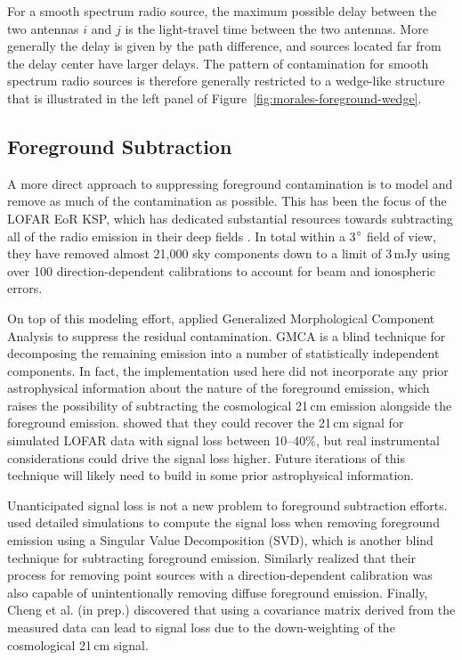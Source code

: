 \begin{bibunit}
For a smooth spectrum radio source, the maximum possible delay between the two antennas $i$ and $j$
is the light-travel time between the two antennas. More generally the delay is given by the path
difference, and sources located far from the delay center have larger delays. The pattern of
contamination for smooth spectrum radio sources is therefore generally restricted to a wedge-like
structure that is illustrated in the left panel of Figure~\ref{fig:morales-foreground-wedge}.


\subsection{Foreground Subtraction}

A more direct approach to suppressing foreground contamination is to model and remove as much of the
contamination as possible. This has been the focus of the LOFAR EoR KSP, which has dedicated
substantial resources towards subtracting all of the radio emission in their deep fields
\citep{2017ApJ...838...65P}. In total within a 3$\mbox{$^\circ$}$ field of view, they have removed almost
21,000 sky components down to a limit of 3\,mJy using over 100 direction-dependent calibrations to
account for beam and ionospheric errors.

On top of this modeling effort, \citet{2017ApJ...838...65P} applied Generalized Morphological
Component Analysis \citep[GMCA;][]{2013MNRAS.429..165C} to suppress the residual contamination.
GMCA is a blind technique for decomposing the remaining emission into a number of statistically
independent components. In fact, the implementation used here did not incorporate any prior
astrophysical information about the nature of the foreground emission, which raises the possibility
of subtracting the cosmological 21\,cm emission alongside the foreground emission.
\citet{2013MNRAS.429..165C} showed that they could recover the 21\,cm signal for simulated LOFAR
data with signal loss between 10--40\%, but real instrumental considerations could drive the signal
loss higher. Future iterations of this technique will likely need to build in some prior
astrophysical information.

Unanticipated signal loss is not a new problem to foreground subtraction efforts.
\citet{2013MNRAS.433..639P} used detailed simulations to compute the signal loss when removing
foreground emission using a Singular Value Decomposition (SVD), which is another blind technique for
subtracting foreground emission. Similarly \citet{2016MNRAS.463.4317P} realized that their process
for removing point sources with a direction-dependent calibration was also capable of
unintentionally removing diffuse foreground emission. Finally, Cheng et al. (in prep.) discovered
that using a covariance matrix derived from the measured data can lead to signal loss due to the
down-weighting of the cosmological 21\,cm signal.


\end{bibunit}
